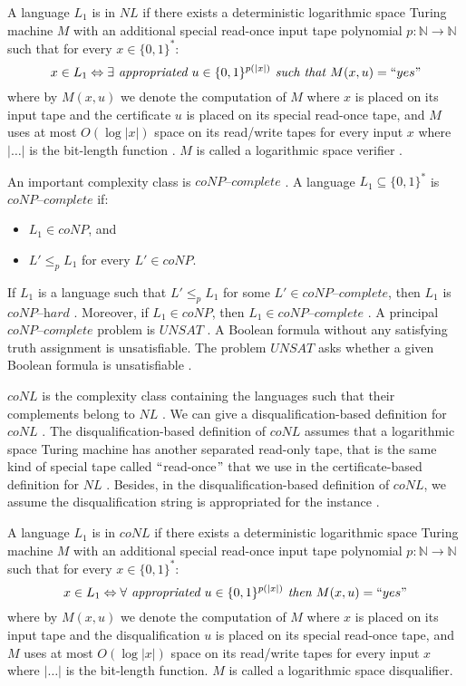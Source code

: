 \documentclass[a4paper,UKenglish,cleveref, autoref]{lipics-v2019}
\begin{document}
\begin{definition}
A language $L_{1}$ is in $NL$ if there exists a deterministic logarithmic space Turing machine $M$ with an additional special read-once input tape polynomial $p: \mathbb{N} \rightarrow \mathbb{N}$ such that for every $x \in \{0, 1\}^{*}$:
\[x \in L_{1} \Leftrightarrow \exists \textit{ appropriated } u \in \{0, 1\}^{p(|x|)} \textit{ such that } M(x, u) = ``yes" \]
where by $M(x, u)$ we denote the computation of $M$ where $x$ is placed on its input tape and the certificate $u$ is placed on its special read-once tape, and $M$ uses at most $O(\log |x|)$ space on its read/write tapes for every input $x$ where $|\ldots|$ is the bit-length function \cite{AB09}. $M$ is called a logarithmic space verifier \cite{AB09}.
\end{definition}

An important complexity class is $\textit{coNP--complete}$ \cite{GJ79}. A language $L_{1} \subseteq \{0, 1\}^{*}$ is $\textit{coNP--complete}$ if:

\begin{itemize}
\item $L_{1} \in coNP$, and
\item $L' \leq_{p} L_{1}$ for every $L' \in coNP$.
\end{itemize}

If $L_{1}$ is a language such that $L' \leq_{p} L_{1}$ for some $L' \in \textit{coNP--complete}$, then $L_{1}$ is $\textit{coNP--hard}$ \cite{CLRS01}. Moreover, if $L_{1} \in coNP$, then $L_{1} \in \textit{coNP--complete}$ \cite{CLRS01}. A principal $\textit{coNP--complete}$ problem is $UNSAT$ \cite{GJ79}. A Boolean formula without any satisfying truth assignment is unsatisfiable. The problem $UNSAT$ asks whether a given Boolean formula is unsatisfiable \cite{GJ79}.

$coNL$ is the complexity class containing the languages such that their complements belong to $NL$ \cite{Pap03}. We can give a disqualification-based definition for $coNL$ \cite{AB09}. The disqualification-based definition of $coNL$ assumes that a logarithmic space Turing machine has another separated read-only tape, that is the same kind of special tape called $``$read-once$"$ that we use in the certificate-based definition for $NL$ \cite{AB09}. Besides, in the disqualification-based definition of $coNL$, we assume the disqualification string is appropriated for the instance \cite{Pap03}.

\begin{definition}
A language $L_{1}$ is in $coNL$ if there exists a deterministic logarithmic space Turing machine $M$ with an additional special read-once input tape polynomial $p: \mathbb{N} \rightarrow \mathbb{N}$ such that for every $x \in \{0, 1\}^{*}$:
\[x \in L_{1} \Leftrightarrow \forall \textit{ appropriated } u \in \{0, 1\}^{p(|x|)} \textit{ then } M(x, u) = ``yes" \]
where by $M(x, u)$ we denote the computation of $M$ where $x$ is placed on its input tape and the disqualification $u$ is placed on its special read-once tape, and $M$ uses at most $O(\log |x|)$ space on its read/write tapes for every input $x$ where $|\ldots|$ is the bit-length function. $M$ is called a logarithmic space disqualifier.
\end{definition}
\end{document}
